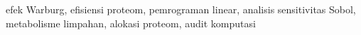 \documentclass[conference]{IEEEtran}
\begin{document}
\begin{IEEEkeywords}
efek Warburg, efisiensi proteom, pemrograman linear,
analisis sensitivitas Sobol, metabolisme limpahan,
alokasi proteom, audit komputasi
\end{IEEEkeywords}











\end{document}
